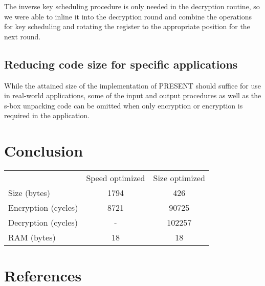 \documentclass{llncs}
\begin{document}
The inverse key scheduling procedure is only needed in the decryption routine, so we were able to inline it into the decryption round and combine the operations for key scheduling and rotating the register to the appropriate position for the next round.

\subsection{Reducing code size for specific applications}
While the attained size of the implementation of PRESENT should suffice for use in real-world applications, some of the input and output procedures as well as the s-box unpacking code can be omitted when only encryption or encryption is required in the application.

\section{Conclusion}
	\begin{tabular}{ l c c }
                & Speed optimized & Size optimized \\
        Size (bytes) & 1794 & 426 \\
        Encryption (cycles) & 8721 & 90725 \\
        Decryption (cycles) & - & 102257 \\
        RAM (bytes) & 18 & 18

	\end{tabular}

\section{References}
{}

\end{document}
